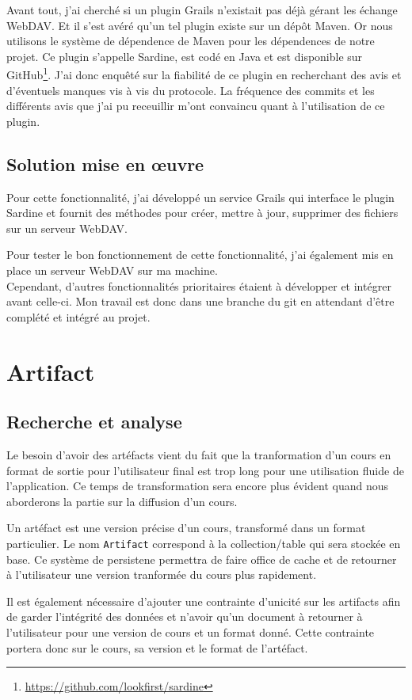 Avant tout, j'ai cherché si un plugin Grails n'existait pas déjà gérant les
échange WebDAV. Et il s'est avéré qu'un tel plugin existe sur un dépôt Maven. Or
nous utilisons le système de dépendence de Maven pour les dépendences de notre
projet. Ce plugin s'appelle Sardine, est codé en Java et est disponible sur
GitHub\footnote{\url{https://github.com/lookfirst/sardine}}. J'ai donc enquêté
sur la fiabilité de ce plugin en recherchant des avis et d'éventuels manques vis
à vis du protocole. La fréquence des commits et les différents avis que j'ai pu
receuillir m'ont convaincu quant à l'utilisation de ce plugin.

\subsection{Solution mise en \oe uvre}
Pour cette fonctionnalité, j'ai développé un service Grails qui interface le
plugin Sardine et fournit des méthodes pour créer, mettre à jour, supprimer
des fichiers sur un serveur WebDAV.

Pour tester le bon fonctionnement de cette fonctionnalité, j'ai également mis en
place un serveur WebDAV sur ma machine.\\

Cependant, d'autres fonctionnalités prioritaires étaient à développer et
intégrer avant celle-ci. Mon travail est donc dans une branche du git en
attendant d'être complété et intégré au projet.

\section{Artifact}
\subsection{Recherche et analyse}
Le besoin d'avoir des artéfacts vient du fait que la tranformation d'un cours en
format de sortie pour l'utilisateur final est trop long pour une utilisation
fluide de l'application. Ce temps de transformation sera encore plus évident
quand nous aborderons la partie sur la diffusion d'un cours.

Un artéfact est une version précise d'un cours, transformé dans un format
particulier. Le nom {\tt Artifact} correspond à la collection/table qui sera
stockée en base. Ce système de persistene permettra de faire office de cache et
de retourner à l'utilisateur une version tranformée du cours plus rapidement.

Il est également nécessaire d'ajouter une contrainte d'unicité sur les artifacts
afin de garder l'intégrité des données et n'avoir qu'un document à retourner à
l'utilisateur pour une version de cours et un format donné. Cette contrainte
portera donc sur le cours, sa version et le format de l'artéfact.

